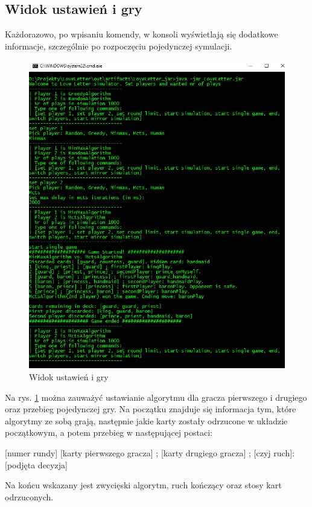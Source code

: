\subsection*{Widok ustawień i gry}
Każdorazowo, po wpisaniu komendy, w konsoli wyświetlają się dodatkowe informacje, szczególnie po rozpoczęciu pojedynczej symulacji.
\begin{figure}[H]
	\centering
	\includegraphics[width=\textwidth]{Resources/cli2.PNG}
	\caption{Widok ustawień i gry} 
	\label{fig:cli2}
\end{figure}

Na rys. \ref{fig:cli2} można zauważyć ustawianie algorytmu dla gracza pierwszego i drugiego oraz przebieg pojedynczej gry. Na początku znajduje się informacja tym, które algorytmy ze sobą grają, następnie jakie karty zostały odrzucone w układzie początkowym, a potem przebieg w następującej postaci:
\begin{center}
	[numer rundy] [karty pierwszego gracza] ; [karty drugiego gracza] ; [czyj ruch]: [podjęta decyzja]
\end{center}
Na końcu wskazany jest zwycięski algorytm, ruch kończący oraz stosy kart odrzuconych.



